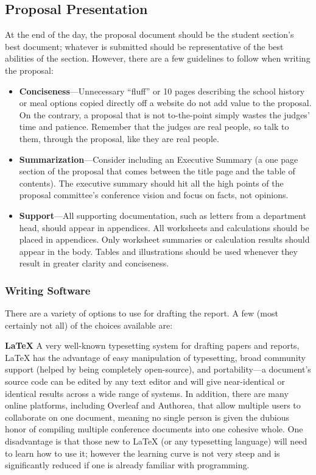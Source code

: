 \documentclass[12pt]{article}
\begin{document}
\subsection{Proposal Presentation}
At the end of the day, the proposal document should be the student section's best document; whatever is submitted should be representative of the best abilities of the section. However, there are a few guidelines to follow when writing the proposal:
\begin{itemize}
\item{\textbf{Conciseness}---Unnecessary ``fluff” or 10 pages describing the school history or meal options copied directly off a website do not add value to the proposal. On the contrary, a proposal that is not to-the-point simply wastes the judges’ time and patience. Remember that the judges
are real people, so talk to them, through the proposal, like they are real people.}

\item{\textbf{Summarization}---Consider including an Executive Summary (a one page section of the proposal that comes
between the title page and the table of contents). The executive summary should hit all
the high points of the proposal committee's conference vision and focus on facts, not opinions.}

\item{\textbf{Support}---All supporting documentation, such as letters from a department head, should appear in appendices. All worksheets and calculations should be placed in appendices. Only worksheet summaries or calculation results should appear in the body. Tables and illustrations should be used whenever they result in greater clarity and conciseness.}
\end{itemize}

\subsubsection{Writing Software}
There are a variety of options to use for drafting the report.
A few (most certainly not all) of the choices available are:

\textbf{\LaTeX}\newline
A very well-known typesetting system for drafting papers and reports, LaTeX has the advantage of easy manipulation of typesetting, broad community support (helped by being completely open-source), and portability---a document's source code can be edited by any text editor and will give near-identical or identical results across a wide range of systems. In addition, there are many online platforms, including Overleaf and Authorea, that allow multiple users to collaborate on one document, meaning no single person is given the dubious honor of compiling multiple conference documents into one cohesive whole. One disadvantage is that those new to LaTeX (or any typesetting language) will need to learn how to use it; however the learning curve is not very steep and is significantly reduced if one is already familiar with programming.
\end{document}
